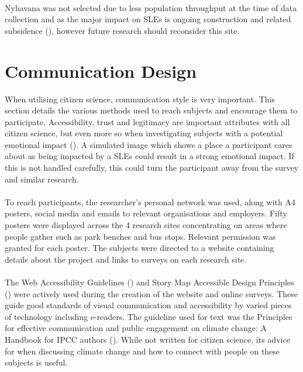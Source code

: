 \paragraph{}
Nyhavana was not selected due to less population throughput at the time of data collection and as the major impact on SLEs is ongoing construction and related subsidence (\cite{miljoenheten_og_byplankontoret_trondheim_kommune_9-notat-om-havnivastigning-og-stormflo---hensyn-i-arealplanlegging-nyhavnapdf_2020}), however future research should reconsider this site.  



\section{Communication Design}

When utilising citizen science, communication style is very important. This section details the various methods used to reach subjects and encourage them to participate. Accessibility, trust and legitimacy are important attributes with all citizen science, but even more so when investigating subjects with a potential emotional impact (\cite{tweddle_guide_2012}). A simulated image which shows a place a participant cares about as being impacted by a SLEs could result in a strong emotional impact. If this is not handled carefully, this could turn the participant away from the survey and similar research.
\paragraph{}

To reach participants, the researcher's personal network was used, along with A4 posters, social media and emails to relevant organisations and employers. Fifty posters were displayed across the 4 research sites concentrating on areas where people gather such as park benches and bus stops. Relevant permission was granted for each poster. The subjects were directed to a website containing details about the project and links to surveys on each research site.
\paragraph{}

The Web Accessibility Guidelines (\cite{henry_web_2022}) and Story Map Accessible Design Principles (\cite{todd_liz_getting_nodate}) were actively used during the creation of the website and online surveys. These guide good standards of visual communication and accessibility by varied pieces of technology including e-readers. The guideline used for text was the Principles for effective communication and public engagement on	climate change: A Handbook for IPCC authors (\cite{corner_a_principles_2018}). While not written for citizen science, its advice for when discussing climate change and how to connect with people on these subjects is useful. 
